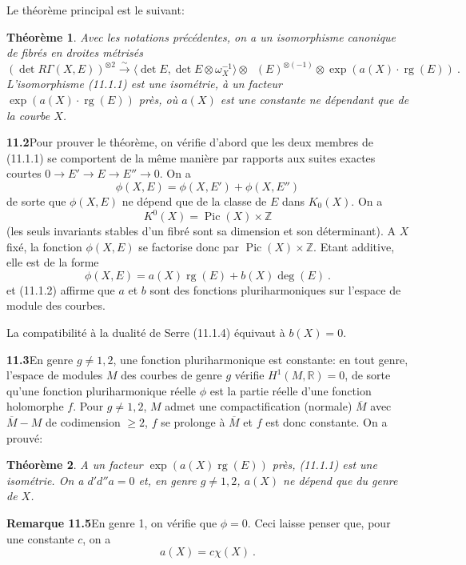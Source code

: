 \documentclass[12pt,a4paper]{article}
\theoremstyle{plain}
\newtheorem{theorem}{Th\'eor\`eme}[section]
\theoremstyle{definition}
\theoremstyle{remark}
\DeclareMathOperator{\Pic}{Pic}
\newcommand{\bbZ}{\mathbb{Z}}
\newcommand{\bbR}{\mathbb{R}}
\DeclareMathOperator{\rg}{rg}
\DeclareMathOperator{\ICtwo}{IC_2}
\newcommand{\simto}{\xrightarrow{\sim}}
\begin{document}
Le th\'eor\`eme principal est le suivant:

\begin{theorem}
Avec les notations pr\'ec\'edentes, on a un isomorphisme canonique de fibr\'es en droites m\'etris\'es
\begin{equation}
\label{eq:11.1.1}
(\det R\Gamma(X, E))^{\otimes 2} \simto \langle \det E, \det E \otimes \omega_X^{-1} \rangle \otimes \ICtwo(E)^{\otimes(-1)} \otimes \exp(a(X) \cdot \rg(E)) \ .
\end{equation}
L'isomorphisme (11.1.1) est une isom\'etrie, \`a un facteur $\exp(a(X) \cdot \rg(E))$ pr\`es, o\`u $a(X)$ est une constante ne d\'ependant que de la courbe $X$.
\end{theorem}

\medskip
\noindent\textbf{11.2}\quad Pour prouver le th\'eor\`eme, on v\'erifie d'abord que les deux membres de (11.1.1) se comportent de la m\^eme mani\`ere par rapports aux suites exactes courtes $0 \to E' \to E \to E'' \to 0$. On a
\[
\phi(X, E) = \phi(X, E') + \phi(X, E'')
\]
de sorte que $\phi(X, E)$ ne d\'epend que de la classe de $E$ dans $K_0(X)$. On a
\[
K^0(X) = \Pic(X) \times \bbZ
\]
(les seuls invariants stables d'un fibr\'e sont sa dimension et son d\'eterminant). A $X$ fix\'e, la fonction $\phi(X, E)$ se factorise donc par $\Pic(X) \times \bbZ$. Etant additive, elle est de la forme
\[
\phi(X, E) = a(X) \rg(E) + b(X) \deg(E) \ .
\]
et (11.1.2) affirme que $a$ et $b$ sont des fonctions pluriharmoniques sur l'espace de module des courbes.

La compatibilit\'e \`a la dualit\'e de Serre (11.1.4) \'equivaut \`a $b(X) = 0$.

\medskip
\noindent\textbf{11.3}\quad En genre $g \neq 1, 2$, une fonction pluriharmonique est constante: en tout genre, l'espace de modules $M$ des courbes de genre $g$ v\'erifie $H^1(M, \bbR) = 0$, de sorte qu'une fonction pluriharmonique r\'eelle $\phi$ est la partie r\'eelle d'une fonction holomorphe $f$. Pour $g \neq 1, 2$, $M$ admet une compactification (normale) $\overline{M}$ avec $\overline{M} - M$ de codimension $\geq 2$, $f$ se prolonge \`a $\overline{M}$ et $f$ est donc constante. On a prouv\'e:

\begin{theorem}
A un facteur $\exp(a(X) \rg(E))$ pr\`es, (11.1.1) est une isom\'etrie. On a $d'd''a = 0$ et, en genre $g \neq 1, 2$, $a(X)$ ne d\'epend que du genre de $X$.
\end{theorem}

\medskip
\noindent\textbf{Remarque 11.5}\quad En genre 1, on v\'erifie que $\phi = 0$. Ceci laisse penser que, pour une constante $c$, on a
\[
a(X) = c \chi(X) \ .
\]
\end{document}
